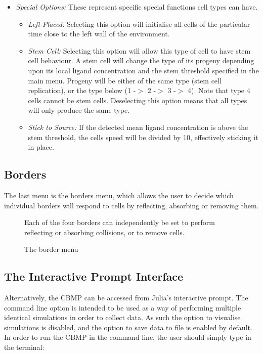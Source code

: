 \documentclass[11.5pt]{article}
\begin{document}
\begin{itemize}
\item {\itshape Special Options: }These represent specific special 
functions cell types can have.
\begin{itemize}
\item {\itshape Left Placed: }Selecting this option will initialise all 
cells of the particular time close to the left wall of the environment.
\item {\itshape Stem Cell: }Selecting this option will allow this type 
of cell to have stem cell behaviour. A stem cell will change the type of 
its progeny depending upon its local ligand concentration and the stem 
threshold specified in the main menu. Progeny will be either of the same 
type (stem cell replication), or the type below (1 -$>$ 2 -$>$ 3 -$>$ 
4). Note that type 4 cells cannot be stem cells. Deselecting this option 
means that all types will only produce the same type.
\item {\itshape Stick to Source: }If the detected mean ligand 
concentration is above the stem threshold, the cells speed will be 
divided by 10, effectively sticking it in place. 
\setcounter{numberedCntE}{\theenumi}
\end{itemize}
\end{itemize}

\subsection{Borders}

The last menu is the borders menu, which allows the user to decide which 
individual borders will respond to cells by reflecting, absorbing or 
removing them.

\begin{figure}[H]
\centering
\caption{The border menu}Each of the four 
borders can independently be set to perform reflecting or absorbing 
collisions, or to remove cells.
\end{figure}

\subsection{The Interactive Prompt Interface}
Alternatively, the CBMP can be accessed from Julia's interactive prompt. 
The command line option is intended to be used as a way of performing 
multiple identical simulations in order to collect data. As such the 
option to visualise simulations is disabled, and the option to save data 
to file is enabled by default. In order to run the CBMP in the command 
line, the user should simply type in the terminal:
\end{document}
